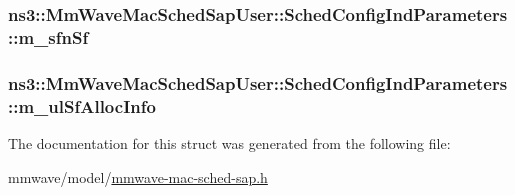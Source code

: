 \subsubsection[{\texorpdfstring{m\+\_\+sfn\+Sf}{m_sfnSf}}]{ ns3\+::\+Mm\+Wave\+Mac\+Sched\+Sap\+User\+::\+Sched\+Config\+Ind\+Parameters\+::m\+\_\+sfn\+Sf}\hypertarget{structns3_1_1MmWaveMacSchedSapUser_1_1SchedConfigIndParameters_a94b982e80f0a15e9f38d12aab4c4b453}{}\label{structns3_1_1MmWaveMacSchedSapUser_1_1SchedConfigIndParameters_a94b982e80f0a15e9f38d12aab4c4b453}
\subsubsection[{\texorpdfstring{m\+\_\+ul\+Sf\+Alloc\+Info}{m_ulSfAllocInfo}}]{ ns3\+::\+Mm\+Wave\+Mac\+Sched\+Sap\+User\+::\+Sched\+Config\+Ind\+Parameters\+::m\+\_\+ul\+Sf\+Alloc\+Info}\hypertarget{structns3_1_1MmWaveMacSchedSapUser_1_1SchedConfigIndParameters_ab695491bd544f1a8483ae5392c8fec4e}{}\label{structns3_1_1MmWaveMacSchedSapUser_1_1SchedConfigIndParameters_ab695491bd544f1a8483ae5392c8fec4e}


The documentation for this struct was generated from the following file\+:\begin{DoxyCompactItemize}
\item 
mmwave/model/\hyperlink{mmwave-mac-sched-sap_8h}{mmwave-\/mac-\/sched-\/sap.\+h}\end{DoxyCompactItemize}
